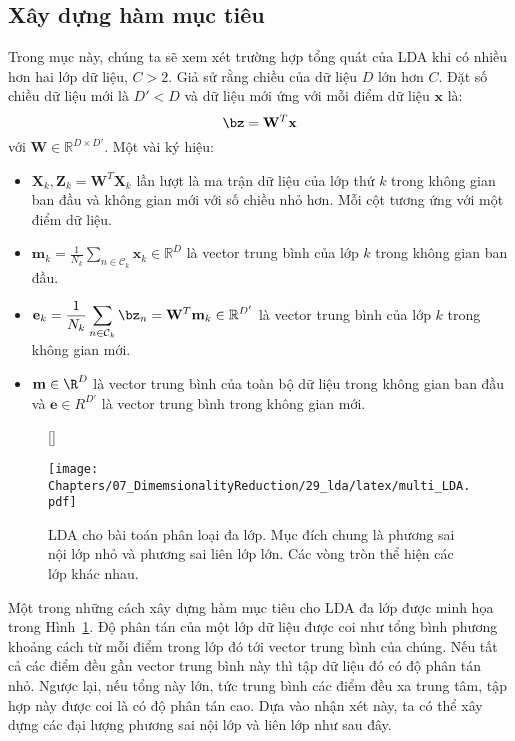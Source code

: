 \subsection{Xây dựng hàm mục tiêu}
Trong mục này, chúng ta sẽ xem xét trường hợp tổng quát của LDA khi có nhiều hơn hai lớp
dữ
liệu, $C > 2$. Giả sử rằng chiều của dữ liệu $D$ lớn hơn $C$.
Đặt số chiều dữ liệu mới là $D' < D$ và dữ liệu mới ứng với mỗi điểm dữ liệu $\mathbf{x}$ là: 
\begin{equation} 
\bz = \mathbf{W}^T\mathbf{x} 
\end{equation} 
với $\mathbf{W} \in \mathbb{R}^{D\times D'}$. 
\newpage
Một vài ký hiệu: 
\begin{itemize}
\item $\mathbf{X}_k, \mathbf{Z}_k = \mathbf{W}^T\mathbf{X}_k$ lần lượt là ma
trận dữ liệu của lớp thứ $k$ trong không gian ban đầu và không gian mới với số
chiều nhỏ hơn. Mỗi cột tương ứng với một điểm dữ liệu. 
 
\item $\displaystyle \mathbf{m}_k = \frac{1}{N_k}\sum_{n \in
\mathcal{C}_k}\mathbf{x}_k \in \mathbb{R}^{D}$ là vector trung bình của lớp $k$ trong không gian ban đầu.
 
\item $\displaystyle \mathbf{e}_k = \frac{1}{N_k}\sum_{n \in \mathcal{C}_k}
\bz_n = \mathbf{W}^T\mathbf{m}_k \in \mathbb{R}^{D'}$ là vector trung bình của lớp
$k$ trong không gian mới.
 
\item $\mathbf{m} \in \R^D$ là vector trung bình của toàn bộ dữ liệu trong không
gian ban đầu và $\mathbf{e} \in R^{D'}$ là vector trung bình trong không gian
mới.
\end{itemize}
 
 
\begin{figure}[t]
     [\FBwidth]
     {\caption{ LDA cho bài toán phân loại đa lớp. Mục đích chung là phương sai nội lớp nhỏ và phương sai liên lớp lớn. Các vòng tròn thể hiện các lớp khác nhau. }
     \label{fig:29_3}}
     { %
     \texttt{[image: Chapters/07\_DimemsionalityReduction/29\_lda/latex/multi\_LDA.pdf]}
     }
\end{figure}
Một trong những cách xây dựng hàm mục tiêu cho LDA đa lớp được minh họa
trong Hình~\ref{fig:29_3}. Độ phân tán của một lớp dữ liệu được coi
như tổng bình phương khoảng cách từ mỗi điểm trong lớp đó tới vector trung bình của chúng. Nếu
tất cả các điểm đều gần vector trung bình này thì tập dữ liệu đó có độ phân tán nhỏ. Ngược lại, nếu tổng này lớn, tức trung bình các điểm đều
xa trung tâm, tập hợp này được coi là có độ phân tán cao.
Dựa vào nhận xét này, ta có thể xây dựng các đại lượng phương sai nội lớp và liên lớp như sau đây. 

